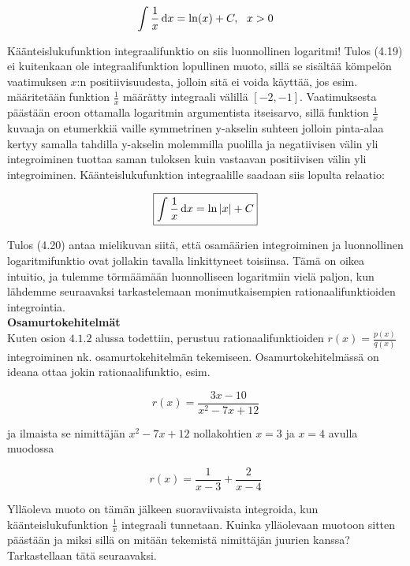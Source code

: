 \documentclass[../integrointiopas.tex]{subfiles}
\begin{document}
	\begin{equation}
		\int \frac{1}{x}\odif{x} = \ln(x) + C, \ \ x > 0
	\end{equation}

	Käänteislukufunktion integraalifunktio on siis luonnollinen logaritmi! Tulos (4.19) ei kuitenkaan ole integraalifunktion lopullinen muoto, sillä se sisältää kömpelön vaatimuksen $x$:n positiivisuudesta, jolloin sitä ei voida käyttää, jos esim. määritetään funktion $\frac{1}{x}$ määrätty integraali välillä $[-2, -1]$. Vaatimuksesta päästään eroon ottamalla logaritmin argumentista itseisarvo, sillä funktion $\frac{1}{x}$ kuvaaja on etumerkkiä vaille symmetrinen y-akselin suhteen jolloin pinta-alaa kertyy samalla tahdilla y-akselin molemmilla puolilla ja negatiivisen välin yli integroiminen tuottaa saman tuloksen kuin vastaavan positiivisen välin yli integroiminen. Käänteislukufunktion integraalille saadaan siis lopulta relaatio:
	
	\begin{equation}
		\boxed{\int \frac{1}{x}\odif{x} = \ln|x| + C}
	\end{equation}

	Tulos (4.20) antaa mielikuvan siitä, että osamäärien integroiminen ja luonnollinen logaritmifunktio ovat jollakin tavalla linkittyneet toisiinsa. Tämä on oikea intuitio, ja tulemme törmäämään luonnolliseen logaritmiin vielä paljon, kun lähdemme seuraavaksi tarkastelemaan monimutkaisempien rationaalifunktioiden integrointia. \\
	
	\noindent\textbf{Osamurtokehitelmät} \\
	
	Kuten osion $4.1.2$ alussa todettiin, perustuu rationaalifunktioiden $r(x) = \frac{p(x)}{q(x)}$ integroiminen nk. osamurtokehitelmän tekemiseen. Osamurtokehitelmässä on ideana ottaa jokin rationaalifunktio, esim.
	
	\begin{equation}
		r(x) = \frac{3x - 10}{x^2 - 7x + 12}
	\end{equation}

	ja ilmaista se nimittäjän $x^2 - 7x + 12$ nollakohtien $x = 3$ ja $x = 4$ avulla muodossa
	
	\begin{equation}
		r(x) = \frac{1}{x - 3} + \frac{2}{x - 4}
	\end{equation}

	Ylläoleva muoto on tämän jälkeen suoraviivaista integroida, kun käänteislukufunktion $\frac{1}{x}$ integraali tunnetaan. Kuinka ylläolevaan muotoon sitten päästään ja miksi sillä on mitään tekemistä nimittäjän juurien kanssa? Tarkastellaan tätä seuraavaksi.
	
\end{document}
